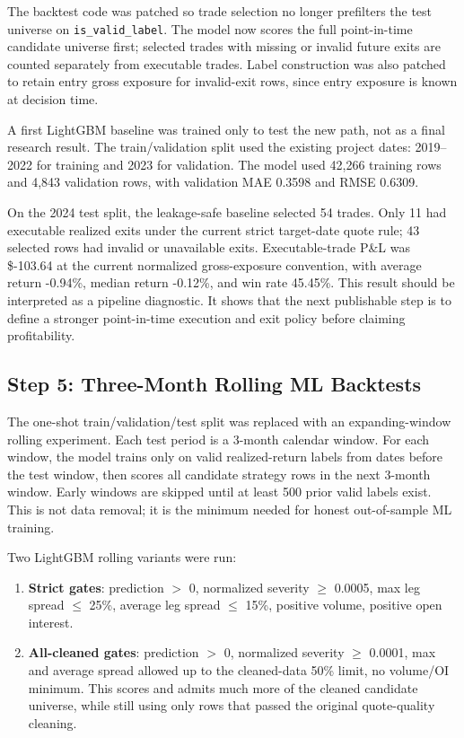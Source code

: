 \documentclass[11pt]{article}
\begin{document}
The backtest code was patched so trade selection no longer prefilters the test
universe on \texttt{is\_valid\_label}. The model now scores the full
point-in-time candidate universe first; selected trades with missing or invalid
future exits are counted separately from executable trades. Label construction
was also patched to retain entry gross exposure for invalid-exit rows, since
entry exposure is known at decision time.

A first LightGBM baseline was trained only to test the new path, not as a final
research result. The train/validation split used the existing project dates:
2019--2022 for training and 2023 for validation. The model used 42,266 training
rows and 4,843 validation rows, with validation MAE 0.3598 and RMSE 0.6309.

On the 2024 test split, the leakage-safe baseline selected 54 trades. Only 11
had executable realized exits under the current strict target-date quote rule;
43 selected rows had invalid or unavailable exits. Executable-trade P\&L was
\$-103.64 at the current normalized gross-exposure convention, with average
return -0.94\%, median return -0.12\%, and win rate 45.45\%. This result should
be interpreted as a pipeline diagnostic. It shows that the next publishable
step is to define a stronger point-in-time execution and exit policy before
claiming profitability.

\subsection*{Step 5: Three-Month Rolling ML Backtests}

The one-shot train/validation/test split was replaced with an expanding-window
rolling experiment. Each test period is a 3-month calendar window. For each
window, the model trains only on valid realized-return labels from dates before
the test window, then scores all candidate strategy rows in the next 3-month
window. Early windows are skipped until at least 500 prior valid labels exist.
This is not data removal; it is the minimum needed for honest out-of-sample ML
training.

Two LightGBM rolling variants were run:

\begin{enumerate}
  \item \textbf{Strict gates}: prediction $>$ 0, normalized severity $\geq$
  0.0005, max leg spread $\leq$ 25\%, average leg spread $\leq$ 15\%, positive
  volume, positive open interest.
  \item \textbf{All-cleaned gates}: prediction $>$ 0, normalized severity
  $\geq$ 0.0001, max and average spread allowed up to the cleaned-data 50\%
  limit, no volume/OI minimum. This scores and admits much more of the cleaned
  candidate universe, while still using only rows that passed the original
  quote-quality cleaning.
\end{enumerate}
\end{document}
